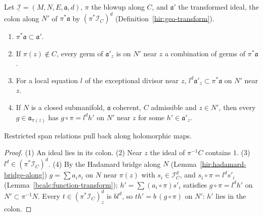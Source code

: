 \begin{lemma}
\label{mc:transform-along-pullback}
\leanok
Let \(\underline{\mathcal I}=(M,N,E,\mathfrak a,d)\), \(\pi\) the blowup along \(C\), and \(\mathfrak a'\) the transformed ideal, the colon along \(N'\) of \(\pi^*\mathfrak a\) by
\((\pi^*\mathcal I_C)^d\) (Definition~\ref{hir:geo-transform}).
\begin{enumerate}
\item \(\pi^*\mathfrak a\subset\mathfrak a'\).
\item If \(\pi(z)\notin C\), every germ of \(\mathfrak a'_z\) is on \(N'\) near \(z\) a combination of germs of \(\pi^*\mathfrak a\).
\item For a local equation \(l\) of the exceptional divisor near \(z\), \(l^d\mathfrak a'_z\subset\pi^*\mathfrak a\) on \(N'\) near \(z\).
\item If \(N\) is a closed submanifold, \(\mathfrak a\) coherent, \(C\) admissible and \(z\in N'\), then every \(g\in\mathfrak a_{\pi(z)}\) has \(g\circ\pi=l^dh'\) on \(N'\)
near \(z\) for some \(h'\in\mathfrak a'_z\).
\end{enumerate}
Restricted span relations pull back along holomorphic maps.
\end{lemma}
\begin{proof}
\leanok
(1) An ideal lies in its colon. (2) Near \(z\) the ideal of \(\pi^{-1}C\) contains \(1\). (3) \(l^d\in(\pi^*\mathcal I_C)^d\). (4) By the Hadamard bridge along \(N\)
(Lemma~\ref{hir:hadamard-bridge-along}) \(g=\sum a_is_i\) on \(N\) near \(\pi(z)\) with \(s_i\in\mathcal I_C^d\), and \(s_i\circ\pi=l^ds'_i\) (Lemma~\ref{bcalc:function-transform});
\(h'=\sum(a_i\circ\pi)s'_i\) satisfies \(g\circ\pi=l^dh'\) on \(N'\subset\pi^{-1}N\). Every \(t\in(\pi^*\mathcal I_C)^d_z\) is \(bl^d\), so \(th'=b\,(g\circ\pi)\) on \(N'\):
\(h'\) lies in the colon.
\end{proof}

